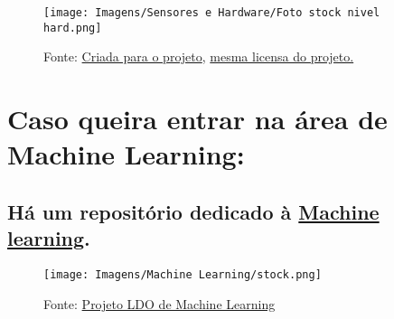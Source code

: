 \documentclass{article}
\begin{document}
\begin{figure}[ht]
    \centering
    \texttt{[image: Imagens/Sensores e Hardware/Foto stock nivel hard.png]}
    \caption{Fonte: \href{https://github.com/solid-titans/LDO-Embarcados-Veiculares}{Criada para o projeto}, \href{https://github.com/solid-titans/LDO-Embarcados-Veiculares/blob/main/LICENSE}{mesma licensa do projeto.}}
\end{figure}


\newpage

\section*{Caso queira entrar na área de Machine Learning:}

\subsection*{\hspace*{4pt} Há um repositório dedicado à \href{https://github.com/MysteRys337/Trabalho-LDO-ML}{Machine learning}.}

\begin{figure}[ht]
    \centering
    \texttt{[image: Imagens/Machine Learning/stock.png]}
    \caption{Fonte: \href{https://github.com/MysteRys337/Trabalho-LDO-ML}{Projeto LDO de Machine Learning}}
\end{figure}
\end{document}
